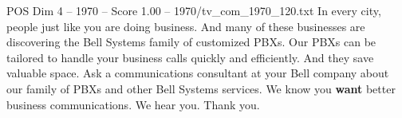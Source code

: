 \begin{textsample}{POS Dim 4 – 1970 – Score 1.00 – 1970/tv\_com\_1970\_120.txt}  \label{ex:f4_pos_033}
In every city, people just like you are doing business.
And many of these businesses are discovering the Bell Systems family of customized PBXs.
Our PBXs can be tailored to handle your business calls quickly and efficiently.
And they save valuable space.
Ask a communications consultant at your Bell company about our family of PBXs and other Bell Systems services.
We know you \textbf{want} better business communications.
We hear you.
Thank you.

\end{textsample}
